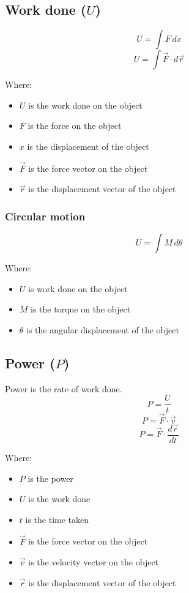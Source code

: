 \documentclass[11pt]{article}
\begin{document}
\subsection{Work done (\(U\))}
\label{sec:org420cf4b}
\[U = \int F \, dx\]
\[U = \int \vec{F} \cdot d \vec{r}\]

Where:
\begin{itemize}
\item \(U\) is the work done on the object
\item \(F\) is the force on the object
\item \(x\) is the displacement of the object
\item \(\vec{F}\) is the force vector on the object
\item \(\vec{r}\) is the displacement vector of the object
\end{itemize}

\subsubsection{Circular motion}
\label{sec:org35661ad}
\[U = \int M \, d \theta\]

Where:
\begin{itemize}
\item \(U\) is work done on the object
\item \(M\) is the torque on the object
\item \(\theta\) is the angular displacement of the object
\end{itemize}

 \newpage

\subsection{Power (\(P\))}
\label{sec:org7b582f2}
Power is the rate of work done.
\[P = \frac{U}{t}\]
\[P = \vec{F} \cdot \vec{v}\]
\[P = \vec{F} \cdot \frac{d \vec{r}}{dt}\]

Where:
\begin{itemize}
\item \(P\) is the power
\item \(U\) is the work done
\item \(t\) is the time taken
\item \(\vec{F}\) is the force vector on the object
\item \(\vec{v}\) is the velocity vector on the object
\item \(\vec{r}\) is the displacement vector of the object
\end{itemize}
\end{document}
